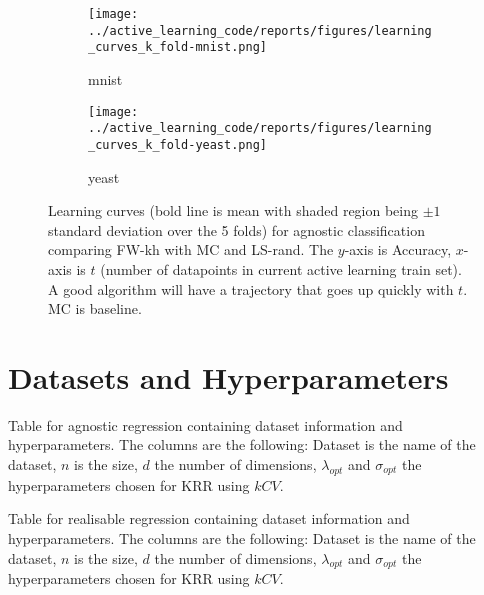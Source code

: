 \begin{figure}[htb]
  \label{figs:agnostic-classification-learning-curves}
  \centering
  \begin{subfigure}[b]{0.48\textwidth}
    \label{fig:learning-curve-agnostic-mnist}
    \texttt{[image: ../active\_learning\_code/reports/figures/learning\_curves\_k\_fold-mnist.png]}
    \caption{mnist}
  \end{subfigure}
  \begin{subfigure}[b]{0.48\textwidth}
    \label{fig:learning-curve-agnostic-yeast}
    \texttt{[image: ../active\_learning\_code/reports/figures/learning\_curves\_k\_fold-yeast.png]}
    \caption{yeast}
  \end{subfigure}
  \caption{Learning curves (bold line is mean with shaded region being \(\pm 1\) standard deviation over the 5 folds) for agnostic classification comparing FW-kh with MC and
    LS-rand. The \(y\)-axis is Accuracy, \(x\)-axis is \(t\)
    (number of datapoints in current active learning train set). A good
    algorithm will have a trajectory that goes up quickly with \(t\). MC is baseline.}
\end{figure}

\FloatBarrier

\section{Datasets and Hyperparameters}

\begin{table}[H]
  \centering
  \vspace{0.5cm}
  \caption{Table for agnostic regression containing dataset information and hyperparameters.
    The columns are the following: Dataset is the name of the dataset, \(n\) is the size, \(d\) the number of
    dimensions, \(\lambda_{opt}\) and \(\sigma_{opt}\) the hyperparameters chosen
    for KRR using \(kCV\).}
\end{table}

\vspace{2cm}
\FloatBarrier

\begin{table}[H]
  \centering
  \vspace{0.5cm}
  \caption{Table for realisable regression containing dataset information and hyperparameters.
    The columns are the following: Dataset is the name of the dataset, \(n\) is the size, \(d\) the number of
    dimensions, \(\lambda_{opt}\) and \(\sigma_{opt}\) the hyperparameters chosen
    for KRR using \(kCV\).}
\end{table}

